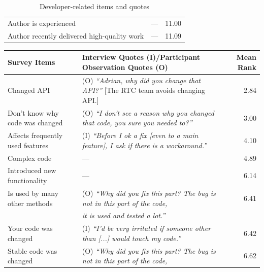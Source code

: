 \begin{table}
\begin{tabular}{l@{\hspace{5pt}}l@{\hspace{-10pt}}r}
Author is experienced &--- & 11.00\\%
Author recently delivered high-quality work &--- & 11.09\\%
\bottomrule
\end{tabular}
\caption{Developer-related items and quotes}
\label{tab:sub-social}
\end{table}

\begin{table}
\small
\centering
\begin{tabular}{l@{\hspace{-10pt}}l@{\hspace{-20pt}}r}
\toprule
Survey Items & Interview Quotes (I)/Participant Observation Quotes (O) & Mean Rank\\
\midrule
Changed API &(O) \emph{``Adrian, why did you change that API?''} [The RTC team avoids changing API.] & 2.84\\%
Don't know why code was changed &(O) \emph{``I don't see a reason why you changed that code, you sure you needed to?''}& 3.00\\%
Affects frequently used features &(I) \emph{``Before I ok a fix [even to a main feature], I ask if there is a workaround.''} & 4.10\\%
Complex code &--- & 4.89\\%
Introduced new functionality &--- & 6.14\\%
Is used by many other methods &(O) {\small\emph{``Why did you fix this part? The bug is not in this part of the code,}}& 6.41\\%
&\emph{ it is used and tested a lot.''}&\\
Your code was changed &(I) \emph{``I'd be very irritated if someone other than [...] would touch my code.''}& 6.42\\%
Stable code was changed &(O) {\small\emph{``Why did you fix this part? The bug is not in this part of the code, }}& 6.62\\%

\end{tabular}
\end{table}
